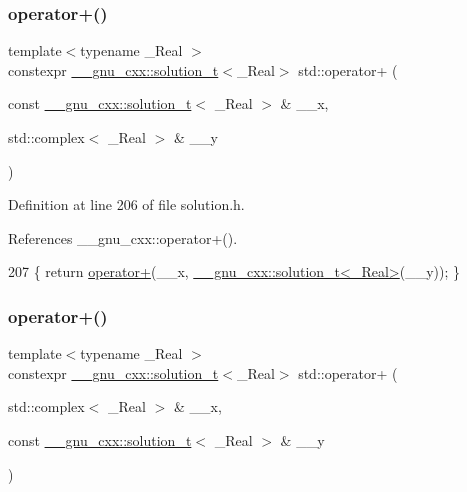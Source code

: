 \subsubsection{\texorpdfstring{operator+()}{operator+()}\hspace{0.1cm}{\footnotesize\ttfamily [5/6]}}
{\footnotesize\ttfamily template$<$typename \+\_\+\+Real $>$ \\
constexpr \hyperlink{namespace____gnu__cxx_ae20ea642de50eb361074c62676b0159c}{\+\_\+\+\_\+gnu\+\_\+cxx\+::solution\+\_\+t}$<$\+\_\+\+Real$>$ std\+::operator+ (\begin{DoxyParamCaption}\item[{const \hyperlink{namespace____gnu__cxx_ae20ea642de50eb361074c62676b0159c}{\+\_\+\+\_\+gnu\+\_\+cxx\+::solution\+\_\+t}$<$ \+\_\+\+Real $>$ \&}]{\+\_\+\+\_\+x,  }\item[{std\+::complex$<$ \+\_\+\+Real $>$ \&}]{\+\_\+\+\_\+y }\end{DoxyParamCaption})}



Definition at line 206 of file solution.\+h.



References \+\_\+\+\_\+gnu\+\_\+cxx\+::operator+().


\begin{DoxyCode}
207     \{ \textcolor{keywordflow}{return} \hyperlink{namespacestd_aa471e6e6583f0beced389171490d8684}{operator+}(\_\_x, \hyperlink{namespace____gnu__cxx_ae20ea642de50eb361074c62676b0159c}{\_\_gnu\_cxx::solution\_t<\_Real>}(\_\_y)); \}
\end{DoxyCode}
\mbox{\label{namespacestd_aa471e6e6583f0beced389171490d8684}} 
\subsubsection{\texorpdfstring{operator+()}{operator+()}\hspace{0.1cm}{\footnotesize\ttfamily [6/6]}}
{\footnotesize\ttfamily template$<$typename \+\_\+\+Real $>$ \\
constexpr \hyperlink{namespace____gnu__cxx_ae20ea642de50eb361074c62676b0159c}{\+\_\+\+\_\+gnu\+\_\+cxx\+::solution\+\_\+t}$<$\+\_\+\+Real$>$ std\+::operator+ (\begin{DoxyParamCaption}\item[{std\+::complex$<$ \+\_\+\+Real $>$ \&}]{\+\_\+\+\_\+x,  }\item[{const \hyperlink{namespace____gnu__cxx_ae20ea642de50eb361074c62676b0159c}{\+\_\+\+\_\+gnu\+\_\+cxx\+::solution\+\_\+t}$<$ \+\_\+\+Real $>$ \&}]{\+\_\+\+\_\+y }\end{DoxyParamCaption})}



